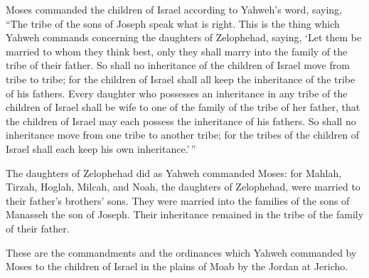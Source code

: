  Moses commanded the children of Israel according to
Yahweh's word, saying, ``The tribe of the sons of Joseph speak what is
right.  This is the thing which Yahweh commands concerning
the daughters of Zelophehad, saying, `Let them be married to whom they
think best, only they shall marry into the family of the tribe of their
father.  So shall no inheritance of the children of Israel
move from tribe to tribe; for the children of Israel shall all keep the
inheritance of the tribe of his fathers.  Every daughter who
possesses an inheritance in any tribe of the children of Israel shall be
wife to one of the family of the tribe of her father, that the children
of Israel may each possess the inheritance of his fathers. 
So shall no inheritance move from one tribe to another tribe; for the
tribes of the children of Israel shall each keep his own
inheritance.'\,''

 The daughters of Zelophehad did as Yahweh commanded Moses:
 for Mahlah, Tirzah, Hoglah, Milcah, and Noah, the
daughters of Zelophehad, were married to their father's brothers' sons.
 They were married into the families of the sons of
Manasseh the son of Joseph. Their inheritance remained in the tribe of
the family of their father.

 These are the commandments and the ordinances which Yahweh
commanded by Moses to the children of Israel in the plains of Moab by
the Jordan at Jericho.
